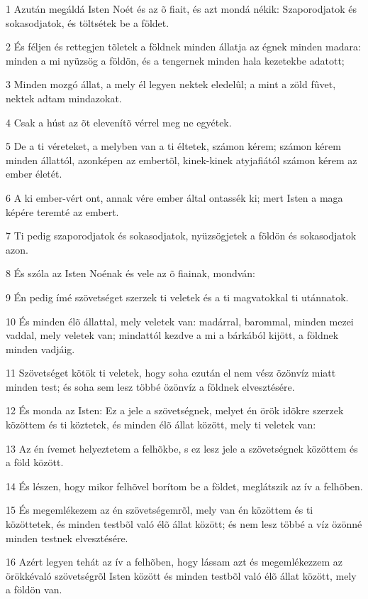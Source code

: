 \par 1 Azután megáldá Isten Noét és az õ fiait, és azt mondá nékik: Szaporodjatok és sokasodjatok, és töltsétek be a földet.
\par 2 És féljen és rettegjen tõletek a földnek minden állatja az égnek minden madara: minden a mi nyüzsög a földön, és a tengernek minden hala kezetekbe adatott;
\par 3 Minden mozgó állat, a mely él legyen nektek eledelûl; a mint a zöld fûvet, nektek adtam mindazokat.
\par 4 Csak a húst az õt elevenítõ vérrel meg ne egyétek.
\par 5 De a ti véreteket, a melyben van a ti éltetek, számon kérem; számon kérem minden állattól, azonképen az embertõl, kinek-kinek atyjafiától számon kérem az ember életét.
\par 6 A ki ember-vért ont, annak vére ember által ontassék ki; mert Isten a maga képére teremté az embert.
\par 7 Ti pedig szaporodjatok és sokasodjatok, nyüzsögjetek a földön és sokasodjatok azon.
\par 8 És szóla az Isten Noénak és vele az õ fiainak, mondván:
\par 9 Én pedig ímé szövetséget szerzek ti veletek és a ti magvatokkal ti utánnatok.
\par 10 És minden élõ állattal, mely veletek van: madárral, barommal, minden mezei vaddal, mely veletek van; mindattól kezdve a mi a bárkából kijött, a földnek minden vadjáig.
\par 11 Szövetséget kötök ti veletek, hogy soha ezután el nem vész özönvíz miatt minden test; és soha sem lesz többé özönvíz a földnek elvesztésére.
\par 12 És monda az Isten: Ez a jele a szövetségnek, melyet én örök idõkre szerzek közöttem és ti köztetek, és minden élõ állat között, mely ti veletek van:
\par 13 Az én ívemet helyeztetem a felhõkbe, s ez lesz jele a szövetségnek közöttem és a föld között.
\par 14 És lészen, hogy mikor felhõvel borítom be a földet, meglátszik az ív a felhõben.
\par 15 És megemlékezem az én szövetségemrõl, mely van én közöttem és ti közöttetek, és minden testbõl való élõ állat között; és nem lesz többé a víz özönné minden testnek elvesztésére.
\par 16 Azért legyen tehát az ív a felhõben, hogy lássam azt és megemlékezzem az örökkévaló szövetségrõl Isten között és minden testbõl való élõ állat között, mely a földön van.
